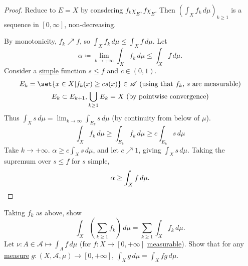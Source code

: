 \documentclass{article}
\begin{document}
\begin{proof}
    Reduce to $E = X$ by consdering $f_k \chi_E, f \chi_E$.
    Then $\left(\int_X f_k \, d\mu\right)_{k \geq 1}$ is a sequence in $[0, \infty]$, non-decreasing.

    By monotonicity, $f_k \nearrow f$, so $\int_X f_k \, d\mu \leq \int_X f \, d\mu$.
    Let
    \begin{equation*}
        \alpha \coloneqq \lim_{k \to +\infty} \int_X f_k \, d\mu \leq \int_X f \, d\mu.
    \end{equation*}
    Consider a \hyperlink{def:simple}{simple} function $s \leq f$ and $c \in (0, 1)$.
    \begin{gather*}
        E_k = \set{x\in X | f_k(x) \geq c s(x)} \in \mathscr{A} \text{ (using that $f_k$, $s$ are measurable)}\\
        E_k \subset E_{k+1}, \bigcup_{k \geq 1} E_k = X \text{ (by pointwise convergence)}
    \end{gather*}
    Thus $\int_X s \, d\mu = \lim_{k \to \infty} \int_{E_k} s \, d\mu$ (by continuity from below of $\mu$).
    \begin{equation*}
        \int_X f_k \, d\mu \geq \int_{E_k} f_k \, d \mu \geq c \int_{E_k} s \, d \mu
    \end{equation*}
    Take $k \to +\infty$. $\alpha \geq c \int_X s \, d\mu$, and let $c \nearrow 1$, giving $\int_X s \, d\mu$.
    Taking the supremum over $s \leq f$ for $s$ simple,
    \begin{equation*}
        \alpha \geq \int_X f \, d\mu.\qedhere
    \end{equation*}
\end{proof}

\begin{ex}
    Taking $f_k$ as above, show
    \begin{equation*}
        \int_X \left(\sum_{k \geq 1} f_k\right) \, d\mu = \sum_{k \geq 1} \int_X f_k \, d\mu.
    \end{equation*}
    Let $\nu: A \in \mathscr{A} \mapsto \int_A f \, d\mu$ (for $f: X \to [0, +\infty]$ \hyperlink{def:measFunc}{measurable}).
    Show that for any \hyperlink{def:measure}{measure} $g: (X, \mathscr{A}, \mu) \to [0, +\infty]$, $\int_X g \, d\mu = \int_X fg \, d\mu$.
\end{ex}
\end{document}
